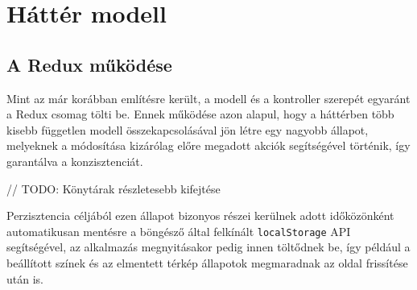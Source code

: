 \section{Háttér modell}

\subsection{A Redux működése}

Mint az már korábban említésre került, a modell és a kontroller szerepét
egyaránt a Redux csomag tölti be. Ennek működése azon alapul, hogy a háttérben
több kisebb független modell összekapcsolásával jön létre egy nagyobb állapot,
melyeknek a módosítása kizárólag előre megadott akciók segítségével történik,
így garantálva a konzisztenciát.

// TODO: Könytárak részletesebb kifejtése

\noindent Perzisztencia céljából ezen állapot bizonyos részei kerülnek adott
időközönként automatikusan mentésre a böngésző által felkínált
\verb|localStorage| API segítségével, az alkalmazás megnyitásakor pedig innen
töltődnek be, így például a beállított színek és az elmentett térkép állapotok
megmaradnak az oldal frissítése után is.
